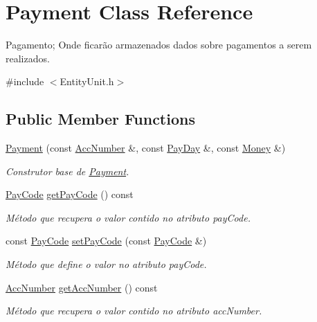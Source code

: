 \hypertarget{classPayment}{\section{Payment Class Reference}
\label{d5/d5e/classPayment}
}


Pagamento; Onde ficarão armazenados dados sobre pagamentos a serem realizados.  




{\ttfamily \#include $<$Entity\-Unit.\-h$>$}

\subsection*{Public Member Functions}
\begin{DoxyCompactItemize}
\item 
\hyperlink{classPayment_a91b7742c5f9b4617e4a3bce6507cce49}{Payment} (const \hyperlink{classAccNumber}{Acc\-Number} \&, const \hyperlink{classPayDay}{Pay\-Day} \&, const \hyperlink{classMoney}{Money} \&)
\begin{DoxyCompactList}\small\item\em Construtor base de \hyperlink{classPayment}{Payment}. \end{DoxyCompactList}\item 
\hyperlink{classPayCode}{Pay\-Code} \hyperlink{classPayment_a1d71998fa33e757bb350eb40895865ae}{get\-Pay\-Code} () const 
\begin{DoxyCompactList}\small\item\em Método que recupera o valor contido no atributo pay\-Code. \end{DoxyCompactList}\item 
const \hyperlink{classPayCode}{Pay\-Code} \hyperlink{classPayment_adf458db6331e53948a473a04a0d622a4}{set\-Pay\-Code} (const \hyperlink{classPayCode}{Pay\-Code} \&)
\begin{DoxyCompactList}\small\item\em Método que define o valor no atributo pay\-Code. \end{DoxyCompactList}\item 
\hyperlink{classAccNumber}{Acc\-Number} \hyperlink{classPayment_a66c51330aef2e045884e25618a194904}{get\-Acc\-Number} () const 
\begin{DoxyCompactList}\small\item\em Método que recupera o valor contido no atributo acc\-Number. \end{DoxyCompactList}\item 

\end{DoxyCompactItemize}
